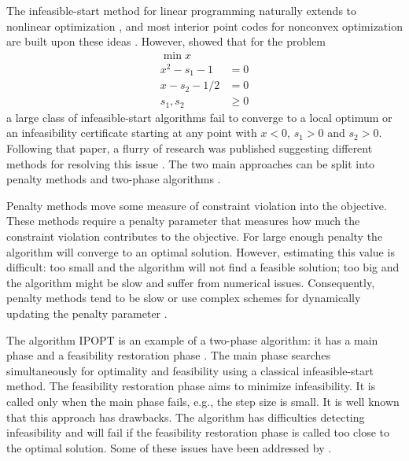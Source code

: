 \documentclass{article}
\begin{document}

The infeasible-start method for linear programming \cite{lustig1990feasibility} naturally extends to nonlinear optimization \cite{kortanek1997infeasible},
and most interior point codes for nonconvex optimization are built upon these ideas \cite{byrd2006knitro,vanderbei1999loqo,wachter2006implementation}. However, \citet*{wachter2000failure} showed that for the problem
\begin{subequations}\label{failure-ex}
\begin{flalign}
\min { x }\\
x^2 - s_1 - 1 &= 0 \\
x - s_2 - 1/2 &= 0 \\
s_1, s_2 &\ge 0
\end{flalign}
\end{subequations}
a large class of infeasible-start algorithms fail to converge to a local optimum or an infeasibility certificate starting at any point with $x < 0$, $s_{1} > 0$ and $s_{2} > 0$. Following that paper, a flurry of research was published suggesting different methods for resolving this issue \cite{benson2004interior,chen2006interior,curtis2012penalty,gould2015interior,liu2004robust,wachter2006implementation}. The two main approaches can be split into penalty methods \cite{chen2006interior,curtis2012penalty,gould2015interior,liu2004robust} and two-phase algorithms \cite{wachter2006implementation}. 

Penalty methods move some measure of constraint violation into the objective. These methods require a penalty parameter that measures how much the constraint violation contributes to the objective. For large enough penalty the algorithm will converge to an optimal solution. However, estimating this value is difficult: too small and the algorithm will not find a feasible solution; too big and the algorithm might be slow and suffer from numerical issues. Consequently, penalty methods tend to be slow \cite[Algorithm 1]{curtis2012penalty} or use complex schemes for dynamically updating the penalty parameter \cite[Algorithm 2]{curtis2012penalty}. 

The algorithm IPOPT is an example of a two-phase algorithm: it has a main phase and a feasibility restoration phase  \cite{wachter2006implementation}. The main phase searches simultaneously for optimality and feasibility using a classical infeasible-start method. The feasibility restoration phase aims to minimize infeasibility. It is called only when the main phase fails, e.g., the step size is small. It is well known that this approach has drawbacks. The algorithm has difficulties detecting infeasibility \cite[Table 15]{huang2016solution} and will fail if the feasibility restoration phase is called too close to the optimal solution. Some of these issues have been addressed by \citet*{nocedal2014interior}. 
\end{document}
